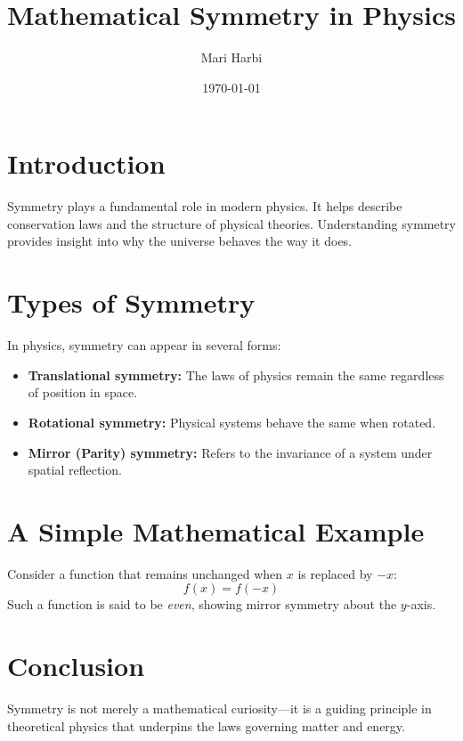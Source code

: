\documentclass[a4paper,12pt]{article} %
\title{Mathematical Symmetry in Physics}  %
\author{Mari Harbi}                   %
\date{\today}                             %
\begin{document}
\maketitle %

\section*{Introduction}
Symmetry plays a fundamental role in modern physics. 
It helps describe conservation laws and the structure of physical theories. 
Understanding symmetry provides insight into why the universe behaves the way it does.

\section*{Types of Symmetry}
In physics, symmetry can appear in several forms:
\begin{itemize}
    \item \textbf{Translational symmetry:} The laws of physics remain the same regardless of position in space.
    \item \textbf{Rotational symmetry:} Physical systems behave the same when rotated.
    \item \textbf{Mirror (Parity) symmetry:} Refers to the invariance of a system under spatial reflection.
\end{itemize}

\section*{A Simple Mathematical Example}
Consider a function that remains unchanged when $x$ is replaced by $-x$:
\[
f(x) = f(-x)
\]
Such a function is said to be \textit{even}, showing mirror symmetry about the $y$-axis.

\section*{Conclusion}
Symmetry is not merely a mathematical curiosity—it is a guiding principle in theoretical physics 
that underpins the laws governing matter and energy.

\end{document}
